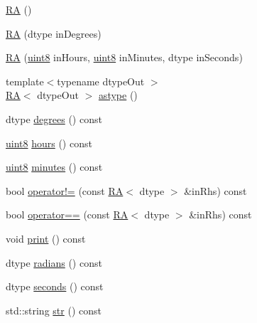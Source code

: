 \begin{DoxyCompactItemize}
\item 
\mbox{\hyperlink{class_num_cpp_1_1_coordinates_1_1_r_a_acf346f1d91b2bca6e8a0dcc65e55fee9}{RA}} ()
\item 
\mbox{\hyperlink{class_num_cpp_1_1_coordinates_1_1_r_a_aad5922149d4f739d1ab3871fa4147554}{RA}} (dtype in\+Degrees)
\item 
\mbox{\hyperlink{class_num_cpp_1_1_coordinates_1_1_r_a_aa735fd57670cd15d05098de22dc51929}{RA}} (\mbox{\hyperlink{namespace_num_cpp_aee396d0469d6031cd18118c0a45bcdda}{uint8}} in\+Hours, \mbox{\hyperlink{namespace_num_cpp_aee396d0469d6031cd18118c0a45bcdda}{uint8}} in\+Minutes, dtype in\+Seconds)
\item 
{\footnotesize template$<$typename dtype\+Out $>$ }\\\mbox{\hyperlink{class_num_cpp_1_1_coordinates_1_1_r_a}{RA}}$<$ dtype\+Out $>$ \mbox{\hyperlink{class_num_cpp_1_1_coordinates_1_1_r_a_aeb69fa9ba4d1935ebc63ba27ccab5216}{astype}} ()
\item 
dtype \mbox{\hyperlink{class_num_cpp_1_1_coordinates_1_1_r_a_a748f19db6ece683524df75ccf71aac72}{degrees}} () const
\item 
\mbox{\hyperlink{namespace_num_cpp_aee396d0469d6031cd18118c0a45bcdda}{uint8}} \mbox{\hyperlink{class_num_cpp_1_1_coordinates_1_1_r_a_a2435ddac71ce32ebe112a5a3d0438df7}{hours}} () const
\item 
\mbox{\hyperlink{namespace_num_cpp_aee396d0469d6031cd18118c0a45bcdda}{uint8}} \mbox{\hyperlink{class_num_cpp_1_1_coordinates_1_1_r_a_af601755307ce7d786cf9acdab95abd45}{minutes}} () const
\item 
bool \mbox{\hyperlink{class_num_cpp_1_1_coordinates_1_1_r_a_aa6c272c2e34488048595dbd9ff850fc3}{operator!=}} (const \mbox{\hyperlink{class_num_cpp_1_1_coordinates_1_1_r_a}{RA}}$<$ dtype $>$ \&in\+Rhs) const
\item 
bool \mbox{\hyperlink{class_num_cpp_1_1_coordinates_1_1_r_a_a9bf19b8eb46f105b46db065be8d383ad}{operator==}} (const \mbox{\hyperlink{class_num_cpp_1_1_coordinates_1_1_r_a}{RA}}$<$ dtype $>$ \&in\+Rhs) const
\item 
void \mbox{\hyperlink{class_num_cpp_1_1_coordinates_1_1_r_a_ac118bac58f240612a3aa488ccb206d14}{print}} () const
\item 
dtype \mbox{\hyperlink{class_num_cpp_1_1_coordinates_1_1_r_a_aa0b9dd49cc734b53a986851ef6b2d957}{radians}} () const
\item 
dtype \mbox{\hyperlink{class_num_cpp_1_1_coordinates_1_1_r_a_ac011791fc4029e74825a06f55ef13194}{seconds}} () const
\item 
std\+::string \mbox{\hyperlink{class_num_cpp_1_1_coordinates_1_1_r_a_a6253a846fef92d3b7ee2e8b97f33ca10}{str}} () const
\end{DoxyCompactItemize}
